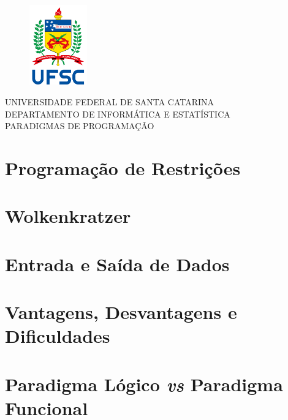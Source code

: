 \documentclass[
	12pt,				%
	openright,			%
	oneside,			%
	a4paper,			%
	english,			%
	brazil,				%
]{abntex2}
\renewcommand{\imprimircapa}{
    \begin{capa}
        \begin{figure}
            \center
            \includegraphics[width=2.5cm]{logo_ufsc}
        \end{figure}
        \center
        \ABNTEXchapterfont\large{UNIVERSIDADE FEDERAL DE SANTA CATARINA\\ DEPARTAMENTO DE INFORMÁTICA E ESTATÍSTICA \\ PARADIGMAS DE PROGRAMAÇÃO}
        \vfill
        \begin{center}
            \ABNTEXchapterfont\bfseries\LARGE\imprimirtitulo
        \end{center}
        \vfill
        {\ABNTEXchapterfont\large\imprimirautor}
        \vfill
        \large\imprimirlocal
        \large\imprimirdata
        \vspace*{1cm}
    \end{capa}
}
\begin{document}
    \imprimircapa
    
    \ABNTEXsectionfont
    \textual
    
    \section*{Programação de Restrições}
        
    
    \section*{Wolkenkratzer}
        
    
    \section*{Entrada e Saída de Dados}
        
    
    \section*{Vantagens, Desvantagens e Dificuldades}
        
    
    \section*{Paradigma Lógico \textit{vs} Paradigma Funcional}
        
\end{document}
